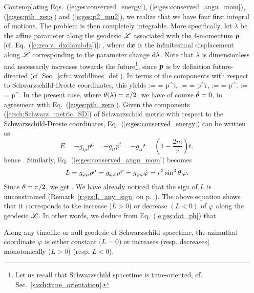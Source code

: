 Contemplating Eqs.~(\ref{e:ges:conserved_energy}), (\ref{e:ges:conserved_angu_mom}),
(\ref{e:ges:pth_zero}) and (\ref{e:ges:p2_mu2}), we realize that we have
four first integral of motions. The problem is then completely integrable.
More specifically, let $\lambda$ be the affine parameter along the geodesic
$\mathscr{L}$ associated with the 4-momentum $\bm{p}$ [cf. Eq.~(\ref{e:geo:v_dxdlambda})]:
\be \label{e:ges:def_lambda}
   ,
\ee
where  $\mathrm{d}\bm{x}$ is the infinitesimal displacement along $\mathscr{L}$ corresponding
to the parameter change $\mathrm{d}\lambda$. Note that $\lambda$ is dimensionless
and necessarily increases towards the future\footnote{Let us recall
that Schwarzschild spacetime is time-oriented, cf. Sec.~\ref{s:sch:time_orientation}.},
since $\bm{p}$ is by definition future-directed (cf. Sec.~\ref{s:fra:worldlines_def}).
In terms of the components with respect to Schwarzschild-Droste coordinates,
this yields
\be \label{e:ges:comp_4_momentum}
     :=  = p^t,\qquad
     :=  = p^r,\qquad
    \dot{\th} := \frac{\D \th}{\D\lambda} = p^\th,\qquad
    \dot{\ph} := \frac{\D \ph}{\D\lambda} = p^\ph .
\ee
In the present case, where $\theta(\lambda)=\pi/2$, we have of course $\dot{\theta}=0$,
in agreement with Eq.~(\ref{e:ges:pth_zero}).
Given the components (\ref{e:sch:Schwarz_metric_SD}) of Schwarzschild metric
with respect to the Schwarzschild-Droste coordinates,
Eq.~(\ref{e:ges:conserved_energy}) can be written as
\[
    E = - g_{t\mu} p^\mu = - g_{tt} p^t = - g_{tt} \dot{t}
    = \left(1 - \frac{2m}{r} \right) \dot{t} ,
\]
hence
\be \label{e:ges:dot_t}
    .
\ee
Similarly, Eq.~(\ref{e:ges:conserved_angu_mom}) becomes
\[
    L = g_{\varphi\mu} p^\mu = g_{\varphi\varphi} p^\varphi  = g_{\varphi\varphi} \dot{\varphi}
        = r^2 \sin^2\theta \, \dot{\varphi} .
\]
Since $\theta=\pi/2$, we get
\be \label{e:ges:dot_ph}
     .
\ee
We have already noticed that the sign of $L$ is unconstrained (Remark~\ref{r:ges:L_any_sign} on p.~\pageref{r:ges:L_any_sign}). The above equation
shows that it corresponds to the increase ($L>0$) or decrease $(L<0)$
of $\varphi$ along the geodesic $\mathscr{L}$. In other words, we deduce from Eq.~(\ref{e:ges:dot_ph})
that
\begin{prop}
Along any timelike or null geodesic of Schwarzschild spacetime,
the azimuthal coordinate $\varphi$ is either constant ($L=0$)
or increases (resp. decreases) monotonically ($L>0$) (resp. $L<0$).
\end{prop}

